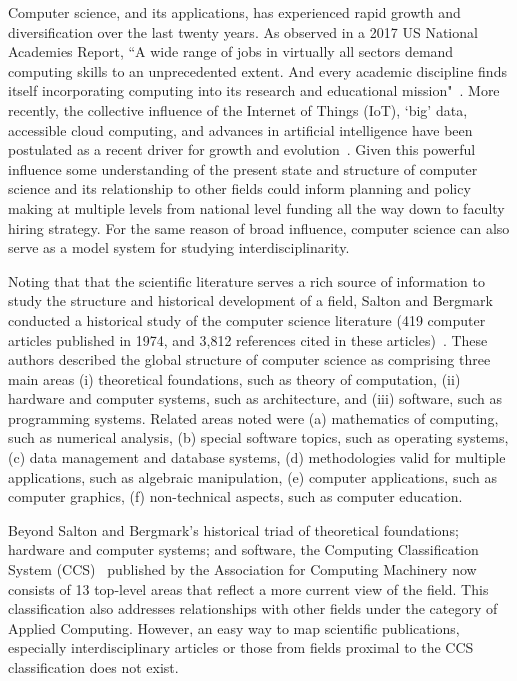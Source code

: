 Computer science, and its applications, has experienced rapid growth and diversification over the last twenty years. As observed in a 2017 US National Academies Report, ``A wide range of jobs in virtually all sectors demand computing skills to an unprecedented extent. And every academic discipline finds itself incorporating computing into its research and educational mission"~\cite{nas_2017}. More recently, the collective influence of the Internet of Things (IoT), `big' data, accessible cloud computing, and advances in artificial intelligence have been postulated as a recent driver for growth and evolution~\cite{siebel2019_digital}. Given this powerful influence some understanding of the present state and structure of computer science and its relationship to other fields could inform planning and policy making at multiple levels from national level funding all the way down to faculty hiring strategy. For the same reason of broad influence, computer science can also serve as a model system for studying interdisciplinarity. 

Noting that that the scientific literature serves a rich source of information to study the structure and historical development of a field, Salton and Bergmark conducted a historical study  of the computer science literature (419 computer articles published in 1974,  and 3,812 references cited in these articles)~\cite{salton_citation_1979}. These authors described the global structure of computer science as comprising three main areas (i) theoretical foundations, such as theory of computation, (ii) hardware and computer systems, such as architecture,  and (iii) software, such as programming systems.  Related areas noted were (a) mathematics of computing, such as numerical analysis, (b) special software topics, such as operating systems, (c) data management and database systems, (d) methodologies valid for multiple applications, such as algebraic manipulation, (e) computer applications, such as computer graphics, (f) non-technical aspects, such as computer education. 

Beyond Salton and Bergmark's historical triad of theoretical foundations; hardware and computer systems; and software, the Computing Classification System (CCS)~\cite{acm_ref} published by the Association for Computing Machinery now consists of 13 top-level areas that reflect a more current view of the field. This classification also addresses relationships with other fields under the category of Applied Computing. However, an easy way to map scientific publications, especially interdisciplinary articles or those from fields proximal to the CCS classification does not exist. 

